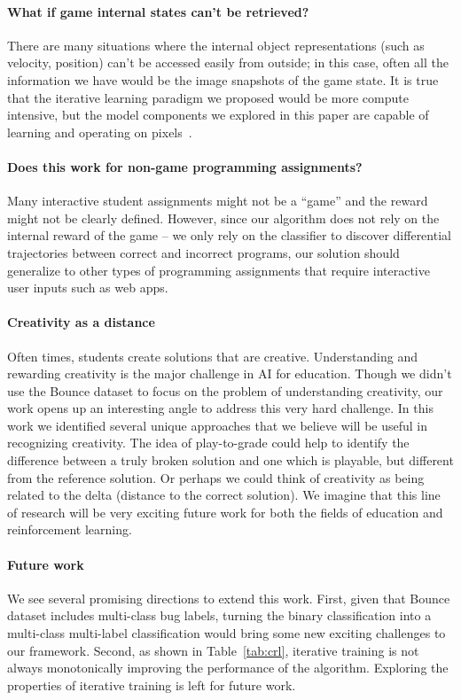 \documentclass{article}
\newcommand{\EDIT}[1]{#1}%
\begin{document}
\paragraph{What if game internal states can't be \EDIT{retrieved}?} There are many situations where the internal object representations (such as velocity, position) can't be accessed easily from outside; in this case, often all the information we have would be the image snapshots of the game state. It is true that the iterative learning paradigm we proposed would be more compute intensive, but the model components we explored in this paper are capable of learning and operating on pixels~\cite{van2016pixel}. 

\paragraph{Does this work for non-game programming assignments?} Many \EDIT{interactive} student assignments might not be a ``game'' and the reward might not be clearly defined. However, since our algorithm does not rely on the internal reward of the game -- we only rely on the classifier to discover  differential trajectories between correct and incorrect programs, our solution should generalize to other types of programming assignments that require interactive user inputs \EDIT{such as web apps}.

\paragraph{Creativity as a distance} Often times, students create solutions that are creative. Understanding and rewarding creativity is the major challenge in AI for education. Though we didn’t use the Bounce dataset to focus on the problem of understanding creativity, our work opens up an interesting angle to address this very hard challenge. In this work we identified several unique approaches that we believe will be useful in recognizing creativity. The idea of play-to-grade could help to identify the difference between a truly broken solution and one which is playable, but different from the reference solution. Or perhaps we could think of creativity as being related to the delta (distance to the correct solution). We imagine that this line of research will be very exciting future work for both the fields of education and reinforcement learning.



\EDIT{\paragraph{Future work} We see several promising directions to extend this work. First, given that Bounce dataset includes multi-class bug labels, turning the binary classification into a multi-class multi-label classification would bring some new exciting challenges to our framework. Second, as shown in Table~\ref{tab:crl}, iterative training is not always monotonically improving the performance of the algorithm. Exploring the properties of iterative training is left for future work.}
\end{document}
